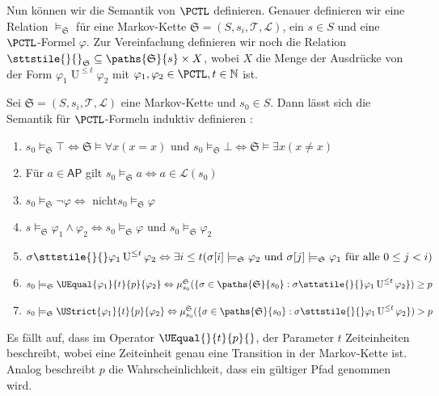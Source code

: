 Nun können wir die Semantik von $\PCTL$ definieren. Genauer definieren wir eine Relation $\models_\mathfrak{S}$ für eine Markov-Kette $\mathfrak{S}=(S,s_i,\mathcal{T},\mathcal{L})$, ein $s\in S$ und eine $\PCTL$-Formel $\varphi$. 
Zur Vereinfachung definieren wir noch die Relation $\sttstile{}{}_\mathfrak{S} \subseteq \paths{\mathfrak{S}}{s} \times X$, wobei $X$ die Menge der Ausdrücke von der Form $\varphi_1 \operatorname{U}^{\leq t}\varphi_2$ mit $\varphi_1,\varphi_2 \in \PCTL, t\in \mathbb{N}$ ist.  

\begin{definition}
	Sei $\mathfrak{S}=(S,s_i,\mathcal{T},\mathcal{L})$ eine Markov-Kette und $s_0\in S$. Dann lässt sich die Semantik für $\PCTL$-Formeln induktiv definieren \cite{hansson1994logic}:
	\begin{enumerate}
		\item $s_0 \models_\mathfrak{S} \top \Leftrightarrow \mathfrak{S}\models \forall x(x=x)$ und $s_0\models_\mathfrak{S} \bot \Leftrightarrow \mathfrak{S}\models \exists x(x\neq x)$
		\item Für $a\in \mathsf{AP}$ gilt $s_0\models_\mathfrak{S} a \Leftrightarrow a\in \mathcal{L}(s_0)$
		\item $s_0 \models_\mathfrak{S}\neg \varphi \Leftrightarrow \text{ nicht} s_0\models_\mathfrak{S} \varphi$
		\item $s\models_\mathfrak{S} \varphi_1\land\varphi_2 \Leftrightarrow s_0\models_\mathfrak{S} \varphi \text{ und } s_0\models_\mathfrak{S} \varphi_2$
		\item $\sigma \sttstile{}{} \varphi_1\operatorname{U}^{\leq t}\varphi_2 \Leftrightarrow \exists i\leq t(\sigma[i]\models_\mathfrak{S} \varphi_2 \text{ und } \sigma[j]\models_\mathfrak{S} \varphi_1 \text{ für alle } 0 \leq j<i)$
		\item $s_0\models_\mathfrak{S} \UEqual{\varphi_1}{t}{p}{\varphi_2} \Leftrightarrow \mu^\mathfrak{S}_{s_0}(\{\sigma \in \paths{\mathfrak{S}}{s_0} : \sigma \sttstile{}{}\varphi_1\operatorname{U}^{\leq t}\varphi_2\})\geq p$
		\item $s_0\models_\mathfrak{S} \UStrict{\varphi_1}{t}{p}{\varphi_2} \Leftrightarrow \mu^\mathfrak{S}_{s_0}(\{\sigma \in \paths{\mathfrak{S}}{s_0} : \sigma \sttstile{}{}\varphi_1\operatorname{U}^{\leq t}\varphi_2\}) > p$
	\end{enumerate}
\end{definition}

Es fällt auf, dass im Operator $\UEqual{}{t}{p}{}$, der Parameter $t$  Zeiteinheiten beschreibt, wobei eine Zeiteinheit genau eine Transition in der Markov-Kette ist. Analog beschreibt $p$ die Wahrscheinlichkeit, dass ein gültiger Pfad \glqq genommen\grqq{} wird.

